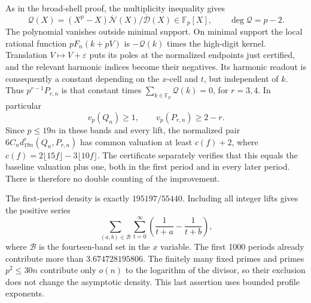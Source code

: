 As in the broad-shell proof, the multiplicity inequality gives
\[
 \mathcal Q(X)=(X^p-X)\overline{\mathcal N}(X)/
                       \overline{\mathcal D}(X)
 \in\mathbb F_p[X],\qquad\deg\mathcal Q=p-2.
\]
The polynomial vanishes outside minimal support. On minimal support the
local rational function $pF_n(k+pV)$ is $-\mathcal Q(k)$ times the
high-digit kernel. Translation $V\mapsto V+\varepsilon$ puts its poles
at the normalized endpoints just certified, and the relevant harmonic
indices become their negatives. Its harmonic readout is consequently a
constant depending on the $x$-cell and $t$, but independent of $k$.
Thus $p^{r-1}P_{r,n}$ is that constant times
$\sum_{k\in\mathbb F_p}\mathcal Q(k)=0$, for $r=3,4$.
In particular
\[
 v_p(Q_n)\ge1,\qquad v_p(P_{r,n})\ge2-r.
\]
Since $p\le19n$ in these bands and every lift,
the normalized pair $6C_nd_{19n}^{r}(Q_n,P_{r,n})$ has common valuation
at least $c(f)+2$, where
$c(f)=2\lfloor15f\rfloor-3\lfloor10f\rfloor$.
The certificate separately verifies that this equals the baseline
valuation plus one, both in the first period and in every later period.
There is therefore no double counting of the improvement.

The first-period density is exactly $195197/55440$. Including all integer
lifts gives the positive series
\[
 \sum_{(a,b)\in\mathcal B}\sum_{t=0}^{\infty}
 \left(\frac1{t+a}-\frac1{t+b}\right),
\]
where $\mathcal B$ is the fourteen-band set in the $x$ variable.
The first 1000 periods already contribute more than $3.674728195806$.
The finitely many fixed primes and primes $p^2\le30n$ contribute only
$o(n)$ to the logarithm of the divisor, so their exclusion does not change
the asymptotic density. This last assertion uses bounded profile exponents.
